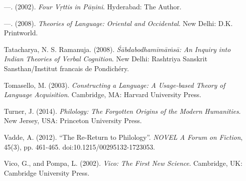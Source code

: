\begin{thebibliography}{99}
  —. (2002). \textit{Four \textit{Vṛttis} in Pāṇini}. Hyderabad: The Author.

  —. (2008). \textit{Theories of Language: Oriental and Occidental}. New Delhi: D.K. Printworld.

  Tatacharya, N. S. Ramanuja. (2008). \textit{Śābdabodhamīmāṁsā: An Inquiry into Indian Theories of Verbal Cognition}. New Delhi: Rashtriya Sanskrit Sansthan/Institut francais de Pondichéry.

  Tomasello, M. (2003). \textit{Constructing a Language: A Usage-based Theory of Language Acquisition}. Cambridge, MA: Harvard University Press.

  Turner, J. (2014). \textit{Philology: The Forgotten Origins of the Modern Humanities}. New Jersey, USA: Princeton University Press.

  Vadde, A. (2012). “The Re-Return to Philology”. \textit{NOVEL A Forum on Fiction}, 45(3), pp. 461-465. doi:10.1215/00295132-1723053.

  Vico, G., and Pompa, L. (2002). \textit{Vico: The First New Science}. Cambridge, UK: Cambridge University Press.

 \end{thebibliography}

\theendnotes

